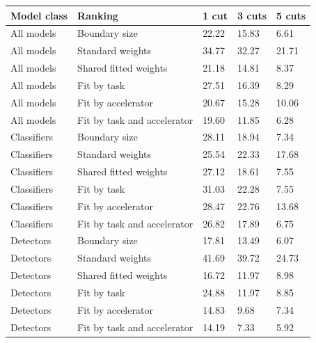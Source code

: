 \begin{tabular}{@{}lllll@{}}
\toprule
Model class & Ranking & 1 cut & 3 cuts & 5 cuts \\
\midrule
All models & Boundary size & 22.22 & 15.83 & 6.61 \\
All models & Standard weights & 34.77 & 32.27 & 21.71 \\
All models & Shared fitted weights & 21.18 & 14.81 & 8.37 \\
All models & Fit by task & 27.51 & 16.39 & 8.29 \\
All models & Fit by accelerator & 20.67 & 15.28 & 10.06 \\
All models & Fit by task and accelerator & 19.60 & 11.85 & 6.28 \\
Classifiers & Boundary size & 28.11 & 18.94 & 7.34 \\
Classifiers & Standard weights & 25.54 & 22.33 & 17.68 \\
Classifiers & Shared fitted weights & 27.12 & 18.61 & 7.55 \\
Classifiers & Fit by task & 31.03 & 22.28 & 7.55 \\
Classifiers & Fit by accelerator & 28.47 & 22.76 & 13.68 \\
Classifiers & Fit by task and accelerator & 26.82 & 17.89 & 6.75 \\
Detectors & Boundary size & 17.81 & 13.49 & 6.07 \\
Detectors & Standard weights & 41.69 & 39.72 & 24.73 \\
Detectors & Shared fitted weights & 16.72 & 11.97 & 8.98 \\
Detectors & Fit by task & 24.88 & 11.97 & 8.85 \\
Detectors & Fit by accelerator & 14.83 & 9.68 & 7.34 \\
Detectors & Fit by task and accelerator & 14.19 & 7.33 & 5.92 \\
\bottomrule
\end{tabular}
